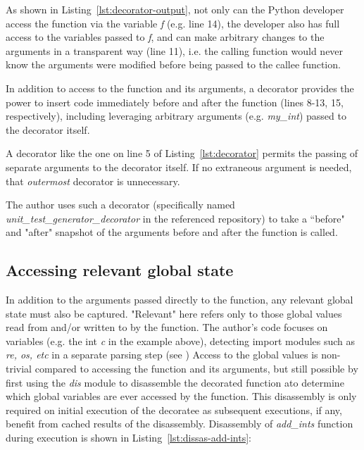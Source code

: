 \documentclass[10pt, conference]{IEEEtran}
\begin{document}
As shown in Listing~\ref{lst:decorator-output}, not only can the Python developer access the function
via the variable \textit{f} (e.g. line 14), the developer also has full
access to the variables passed to \textit{f}, and can make 
arbitrary changes to the arguments in a transparent way (line 11), 
i.e. the calling function would never know the arguments 
were modified before being passed to the callee function.

In addition to access to the function and its arguments,
a decorator provides the power to insert code immediately before and after 
the function (lines 8-13, 15, respectively), including leveraging arbitrary
arguments (e.g. \textit{my\_int}) passed to the decorator itself.

A decorator like the one on line 5 of Listing~\ref{lst:decorator} permits
the passing of separate arguments to the decorator itself.  
If no extraneous argument is needed, that \textit{outermost} decorator
is unnecessary.

The author uses such a decorator (specifically named 
\break
\textit{unit\_test\_generator\_decorator} in the referenced repository) to take
 a “before" and "after" snapshot of the arguments
before and after the function is called.

\subsection{Accessing relevant global state}\label{sec:approach-internal-2}

In addition to the arguments passed directly to the function, any relevant 
global state must also be captured. "Relevant" here refers only to those 
global values read from and/or written to by the function.
The author's code focuses on variables (e.g. the int \textit{c} in the example above), 
detecting import modules such as \textit{re, os, etc} in a separate parsing step 
(see )
Access to the global values is non-trivial compared to accessing the function 
and its arguments, but still possible by first using the \textit{dis}
module to disassemble the decorated function ato determine which global variables 
are ever accessed by the function.  This disassembly is only 
required on initial execution of the decoratee as subsequent executions, if any, 
benefit from cached results of the disassembly.
Disassembly of \textit{add\_ints} function during execution is shown
in Listing~\ref{lst:dissas-add-ints}:


\end{document}
